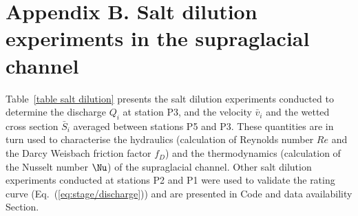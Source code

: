 \section{Appendix B. Salt dilution experiments in the supraglacial channel}
\label{sec:appendixB}

Table~\ref{table salt dilution} presents the salt dilution experiments conducted to determine the discharge $Q_i$ at station P3, and the velocity $\bar v_i$ and the wetted cross section $\bar S_i$ averaged between stations P5 and P3. These quantities are in turn used to characterise the hydraulics (calculation of Reynolds number $Re$ and the Darcy Weisbach friction factor $f_D$) and the thermodynamics (calculation of the Nusselt number $\Nu$) of the supraglacial channel. Other salt dilution experiments conducted at stations P2 and P1 were used to validate the rating curve (Eq.~(\ref{eq:stage/discharge})) and are presented in Code and data availability Section.

